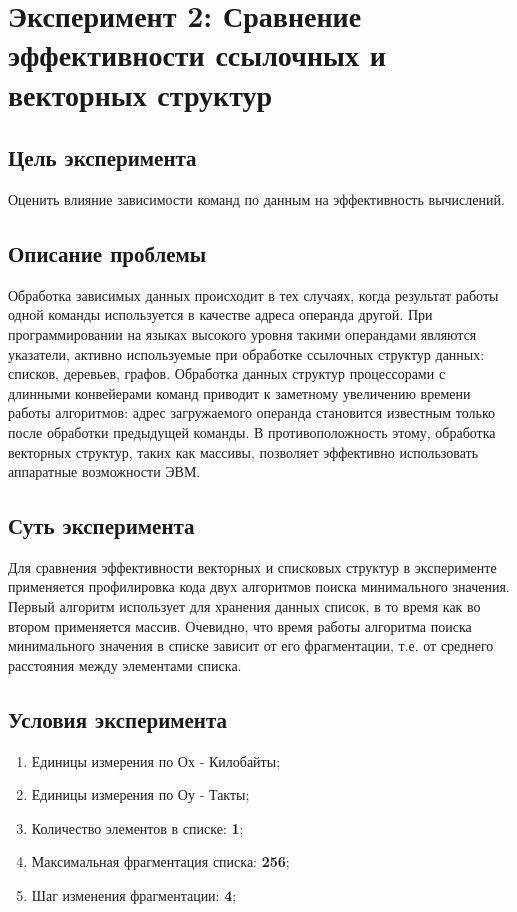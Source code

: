 \chapter{Эксперимент 2: Сравнение эффективности ссылочных и векторных структур}

\section{Цель эксперимента}
Оценить влияние зависимости команд по данным на эффективность вычислений.

\section{Описание проблемы}
Обработка зависимых данных происходит в тех случаях, когда результат работы одной команды используется в качестве адреса операнда другой. При программировании на языках высокого уровня такими операндами являются указатели, активно используемые при обработке ссылочных структур данных: списков, деревьев, графов. Обработка данных структур процессорами с длинными конвейерами команд приводит к заметному увеличению времени работы алгоритмов: адрес загружаемого операнда становится известным только после обработки предыдущей команды. В противоположность этому, обработка векторных структур, таких как массивы, позволяет эффективно использовать аппаратные возможности ЭВМ. 

\section{Суть эксперимента}
Для сравнения эффективности векторных и списковых структур в эксперименте применяется профилировка кода двух алгоритмов поиска минимального значения. Первый алгоритм использует для хранения данных список, в то время как во втором применяется массив. Очевидно, что время работы алгоритма поиска минимального значения в списке зависит от его фрагментации, т.е. от среднего расстояния между элементами списка. 

\section{Условия эксперимента}
\begin{enumerate}
    \item Единицы измерения по Ох - Килобайты;
    \item Единицы измерения по Оу - Такты;
    \item Количество элементов в списке: \textbf{1};
    \item Максимальная фрагментация списка: \textbf{256};
    \item Шаг изменения фрагментации: \textbf{4};
\end{enumerate}

